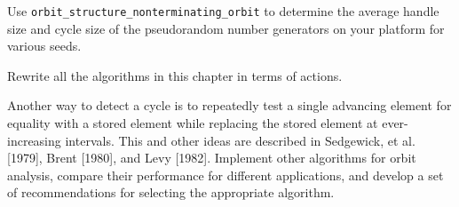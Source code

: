 \begin{exercise}
	Use \verb|orbit_structure_nonterminating_orbit| to determine the average handle size and
	cycle size of the pseudorandom number generators on your platform for various seeds.
\end{exercise}

\begin{exercise}
	Rewrite all the algorithms in this chapter in terms of actions.
\end{exercise}

\begin{project}
	Another way to detect a cycle is to repeatedly test a single advancing element for
	equality with a stored element while replacing the stored element at ever-increasing
	intervals. This and other ideas are described in Sedgewick, et al. [1979], Brent [1980],
	and Levy [1982]. Implement other algorithms for orbit analysis, compare their
	performance for different applications, and develop a set of recommendations for
	selecting the appropriate algorithm.
\end{project}
